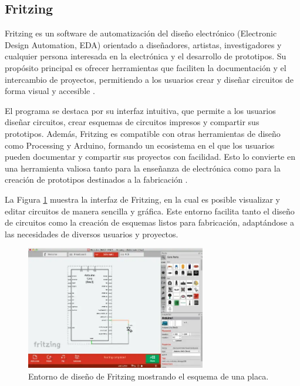 \subsection{Fritzing}
Fritzing es un software de automatización del diseño electrónico (Electronic Design Automation, EDA) orientado a diseñadores, artistas, investigadores y cualquier persona interesada en la electrónica y el desarrollo de prototipos. Su propósito principal es ofrecer herramientas que faciliten la documentación y el intercambio de proyectos, permitiendo a los usuarios crear y diseñar circuitos de forma visual y accesible \cite{FritzingSoftware}.

El programa se destaca por su interfaz intuitiva, que permite a los usuarios diseñar circuitos, crear esquemas de circuitos impresos y compartir sus prototipos. Además, Fritzing es compatible con otras herramientas de diseño como Processing y Arduino, formando un ecosistema en el que los usuarios pueden documentar y compartir sus proyectos con facilidad. Esto lo convierte en una herramienta valiosa tanto para la enseñanza de electrónica como para la creación de prototipos destinados a la fabricación \cite{FritzingPrimerosPasos}.

La Figura \ref{fig:fritzingf} muestra la interfaz de Fritzing, en la cual es posible visualizar y editar circuitos de manera sencilla y gráfica. Este entorno facilita tanto el diseño de circuitos como la creación de esquemas listos para fabricación, adaptándose a las necesidades de diversos usuarios y proyectos.

\begin{figure}[H]
\leavevmode
\begin{minipage}{\textwidth}
\begin{center}
    \includegraphics[width=0.7\textwidth]{./capitulo_03/figures/SW/fritzing.png} %
    \caption{Entorno de diseño de Fritzing mostrando el esquema de una placa\cite{FritzingPrimerosPasos}.}
    \label{fig:fritzingf}
\end{center}
\end{minipage}
\end{figure}



